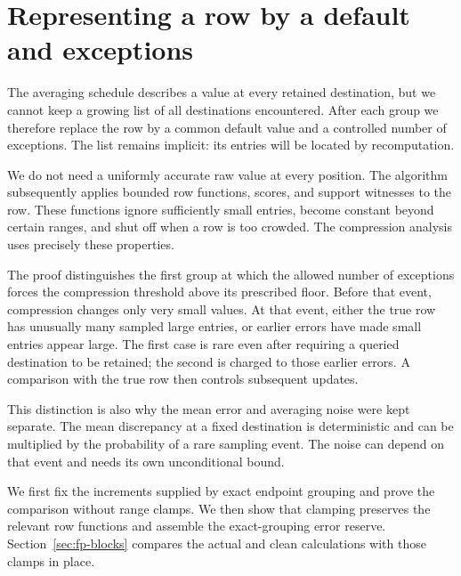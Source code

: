 \section{Representing a row by a default and exceptions}
\label{sec:buf-compression}

The averaging schedule describes a value at every retained destination, but we cannot keep a growing list of all destinations encountered. After each group we therefore replace the row by a common default value and a controlled number of exceptions. The list remains implicit: its entries will be located by recomputation.

We do not need a uniformly accurate raw value at every position. The algorithm subsequently applies bounded row functions, scores, and support witnesses to the row. These functions ignore sufficiently small entries, become constant beyond certain ranges, and shut off when a row is too crowded. The compression analysis uses precisely these properties.

The proof distinguishes the first group at which the allowed number of exceptions forces the compression threshold above its prescribed floor. Before that event, compression changes only very small values. At that event, either the true row has unusually many sampled large entries, or earlier errors have made small entries appear large. The first case is rare even after requiring a queried destination to be retained; the second is charged to those earlier errors. A comparison with the true row then controls subsequent updates.

This distinction is also why the mean error and averaging noise were kept separate. The mean discrepancy at a fixed destination is deterministic and can be multiplied by the probability of a rare sampling event. The noise can depend on that event and needs its own unconditional bound.

We first fix the increments supplied by exact endpoint grouping and prove
the comparison without range clamps.  We then show that clamping preserves
the relevant row functions and assemble the exact-grouping error reserve.
Section~\ref{sec:fp-blocks} compares the actual and clean calculations with
those clamps in place.

